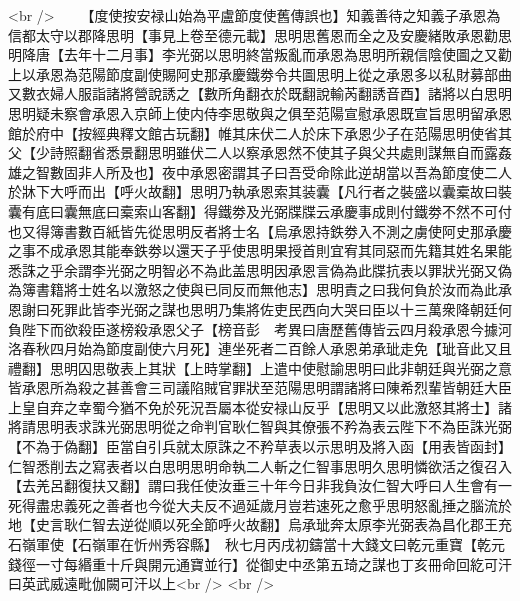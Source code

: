<br />
　　【度使按安禄山始為平盧節度使舊傳誤也】知義善待之知義子承恩為信都太守以郡降思明【事見上卷至德元載】思明思舊恩而全之及安慶緒敗承恩勸思明降唐【去年十二月事】李光弼以思明終當叛亂而承恩為思明所親信陰使圖之又勸上以承恩為范陽節度副使賜阿史那承慶鐵劵令共圖思明上從之承恩多以私財募部曲又數衣婦人服詣諸將營說誘之【數所角翻衣於既翻說輸芮翻誘音酉】諸將以白思明思明疑未察會承恩入京師上使内侍李思敬與之俱至范陽宣慰承恩既宣旨思明留承恩館於府中【按經典釋文館古玩翻】帷其床伏二人於床下承恩少子在范陽思明使省其父【少詩照翻省悉景翻思明雖伏二人以察承恩然不使其子與父共處則謀無自而露姦雄之智數固非人所及也】夜中承恩密謂其子曰吾受命除此逆胡當以吾為節度使二人於牀下大呼而出【呼火故翻】思明乃執承恩索其装囊【凡行者之裝盛以囊槖故曰裝囊有底曰囊無底曰槖索山客翻】得鐵劵及光弼牒牒云承慶事成則付鐵劵不然不可付也又得簿書數百紙皆先從思明反者將士名【烏承恩持鉄劵入不測之虜使阿史那承慶之事不成承恩其能奉鉄劵以還天子乎使思明果授首則宜宥其同惡而先籍其姓名果能悉誅之乎余謂李光弼之明智必不為此盖思明因承恩言偽為此牒抗表以罪狀光弼又偽為簿書籍將士姓名以激怒之使與已同反而無他志】思明責之曰我何負於汝而為此承恩謝曰死罪此皆李光弼之謀也思明乃集將佐吏民西向大哭曰臣以十三萬衆降朝廷何負陛下而欲殺臣遂榜殺承恩父子【榜音彭　考異曰唐歷舊傳皆云四月殺承恩今據河洛春秋四月始為節度副使六月死】連坐死者二百餘人承恩弟承玼走免【玼音此又且禮翻】思明囚思敬表上其狀【上時掌翻】上遣中使慰諭思明曰此非朝廷與光弼之意皆承恩所為殺之甚善會三司議陷賊官罪狀至范陽思明謂諸將曰陳希烈輩皆朝廷大臣上皇自弃之幸蜀今猶不免於死況吾屬本從安禄山反乎【思明又以此激怒其將士】諸將請思明表求誅光弼思明從之命判官耿仁智與其僚張不矜為表云陛下不為臣誅光弼【不為于偽翻】臣當自引兵就太原誅之不矜草表以示思明及將入函【用表皆函封】仁智悉削去之寫表者以白思明思明命執二人斬之仁智事思明久思明憐欲活之復召入【去羌呂翻復扶又翻】謂曰我任使汝垂三十年今日非我負汝仁智大呼曰人生會有一死得盡忠義死之善者也今從大夫反不過延歲月豈若速死之愈乎思明怒亂捶之腦流於地【史言耿仁智去逆從順以死全節呼火故翻】烏承玼奔太原李光弼表為昌化郡王充石嶺軍使【石嶺軍在忻州秀容縣】　秋七月丙戌初鑄當十大錢文曰乾元重寶【乾元錢徑一寸每緡重十斤與開元通寶並行】從御史中丞第五琦之謀也丁亥冊命回紇可汗曰英武威遠毗伽闕可汗以上<br />
<br />
